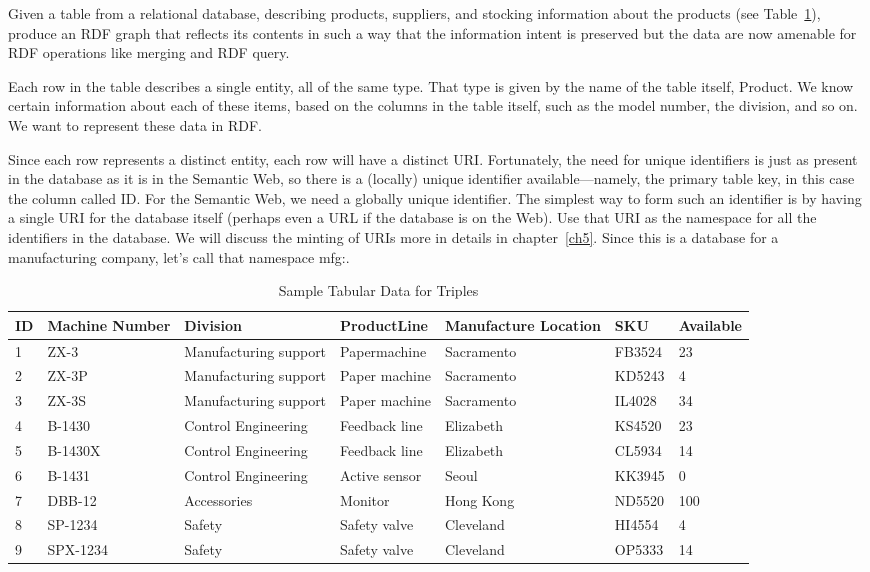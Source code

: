 \begin{challenge}
\label{chal:1}

Given a table from a relational database, describing products,
suppliers, and stocking information about the products (see Table~\ref{tab:ch3.12}),
produce an RDF graph that reflects its contents in such a
way that the information intent is preserved but the data are now
amenable for RDF operations like merging and RDF query.

\solution

Each row in the table describes a single entity, all of the same type.
That type is given by the name of the table itself, Product. We know
certain information about each of these items, based on the columns in
the table itself, such as the model number, the division, and so on. We
want to represent these data in RDF.

Since each row represents a distinct entity, each row will have a
distinct URI. Fortunately, the need for unique identifiers is just as present in the database as it is in the
Semantic Web, so there is a (locally) unique identifier
available---namely, the primary table key, in this case the column
called ID. For the Semantic Web, we need a globally unique identifier.
The simplest way to form such an identifier is by having a single URI
for the database itself (perhaps even a URL if the database is on the
Web). Use that URI as the namespace for all the identifiers in the
database. We will discuss the minting of URIs more in details in chapter~\ref{ch5}. 
Since this is a database for a manufacturing company, let's call that
namespace mfg:.

\begin{table}[h]
\centering
\begin{tabular}{||l l l l l l l ||} 
 \hline
 ID&Machine Number&Division&ProductLine&Manufacture Location&SKU&Available \\ [0.5ex] 
 \hline\hline
1&ZX-3&Manufacturing support&Papermachine&Sacramento&FB3524&23\\
2&ZX-3P&Manufacturing support&Paper machine&Sacramento&KD5243&4\\
3&ZX-3S&Manufacturing support&Paper machine&Sacramento&IL4028&34\\
4&B-1430&Control Engineering&Feedback line&Elizabeth&KS4520&23\\
5&B-1430X&Control Engineering&Feedback line&Elizabeth&CL5934&14\\
6&B-1431&Control Engineering&Active sensor&Seoul&KK3945&0\\
7&DBB-12&Accessories&Monitor&Hong Kong&ND5520&100\\
8&SP-1234&Safety&Safety valve&Cleveland&HI4554&4\\
9&SPX-1234&Safety&Safety valve&Cleveland&OP5333&14\\
\hline
\end{tabular}
\caption{Sample Tabular Data for Triples}
\label{tab:ch3.12}
\end{table}




\end{challenge}
